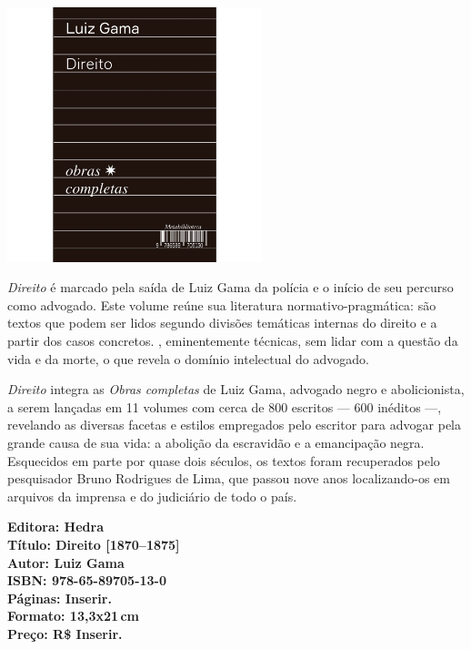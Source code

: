\begin{center}
\hspace*{-3.6cm}
\hspace*{3.1cm}\includegraphics[width=74mm]{./CAPAS/HEDRA_DIREITO.jpg}
\end{center}
\hspace*{-7cm}\hrulefill\hspace*{-7cm}
\medskip

\noindent{}\textit{Direito} é marcado pela saída de Luiz Gama da polícia e o início de seu percurso como advogado. Este volume reúne sua literatura normativo-pragmática: são textos que podem ser lidos segundo divisões temáticas internas do direito e a partir dos casos concretos. , eminentemente técnicas, sem lidar com a questão da vida e da morte, o que revela o domínio intelectual do advogado.

\textit{Direito} integra as \textit{Obras completas} de Luiz Gama, advogado negro e abolicionista, a serem lançadas em 11 volumes com cerca de 800 escritos --- 600 inéditos ---, revelando as diversas facetas e estilos empregados pelo escritor para advogar pela grande causa de sua vida: a abolição da escravidão e a emancipação negra. Esquecidos em parte por quase dois séculos, os textos foram recuperados pelo pesquisador Bruno Rodrigues de Lima, que passou nove anos localizando-os em arquivos da imprensa e do judiciário de todo o país.

\vfill
\noindent\begin{minipage}[c]{1\linewidth}
{\small\textbf{
\hspace*{-.1cm}Editora: Hedra\\
Título: Direito [1870--1875]\\
Autor: Luiz Gama\\ 
ISBN: 978-65-89705-13-0\\
Páginas: Inserir.\\
Formato: 13,3x21\,cm\\
Preço: R\$ Inserir.\\
}}
\end{minipage}
\pagebreak

